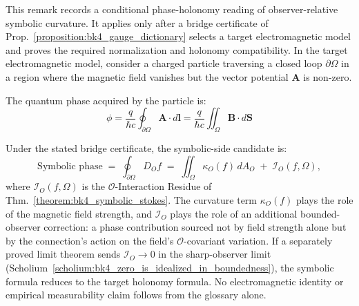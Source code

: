 \begin{remark}
\label{remark:bk4_aharonov_bohm}
This remark records a conditional phase-holonomy reading of observer-relative symbolic curvature. It applies only after a bridge certificate of Prop.~\ref{proposition:bk4_gauge_dictionary} selects a target electromagnetic model and proves the required normalization and holonomy compatibility.
In the target electromagnetic model, consider a charged particle traversing a closed loop $\partial\Omega$ in a region where the magnetic field vanishes but the vector potential $\mathbf{A}$ is non-zero.

The quantum phase acquired by the particle is:
\[
\phi = \frac{q}{\hbar c} \oint_{\partial\Omega} \mathbf{A} \cdot d\mathbf{l} = \frac{q}{\hbar c} \iint_\Omega \mathbf{B} \cdot d\mathbf{S}
\]

Under the stated bridge certificate, the symbolic-side candidate is:
\[
\text{Symbolic phase} \;=\; \oint_{\partial\Omega} D_O f \;=\; \iint_\Omega \kappa_O(f) \, dA_O \;+\; \mathcal{I}_O(f,\Omega),
\]
where $\mathcal{I}_O(f,\Omega)$ is the $\mathcal{O}$-Interaction Residue of Thm.~\ref{theorem:bk4_symbolic_stokes}. The curvature term $\kappa_O(f)$ plays the role of the magnetic field strength, and $\mathcal{I}_O$ plays the role of an additional bounded-observer correction: a phase contribution sourced not by field strength alone but by the connection's action on the field's $\mathcal{O}$-covariant variation. If a separately proved limit theorem sends $\mathcal{I}_O\to0$ in the sharp-observer limit (Scholium~\ref{scholium:bk4_zero_is_idealized_in_boundedness}), the symbolic formula reduces to the target holonomy formula. No electromagnetic identity or empirical measurability claim follows from the glossary alone.
\end{remark}

